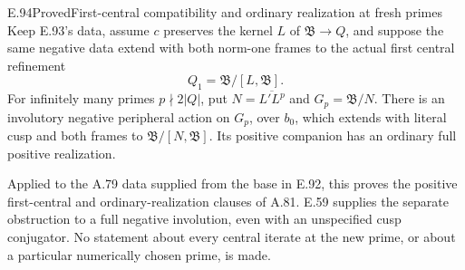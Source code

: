 \begin{result}{E.94}{Proved}{First-central compatibility and ordinary realization at fresh primes}
Keep E.93's data, assume \(c\) preserves the kernel \(L\) of
\(\mathfrak B\to Q\), and suppose the same negative data extend
with both norm-one frames to the actual first central refinement
\[
 Q_1=\mathfrak B/[L,\mathfrak B].
 \]
For infinitely many primes \(p\nmid2|Q|\), put
\(N=\overline{L'L^p}\) and \(G_p=\mathfrak B/N\).
There is an involutory negative peripheral action on \(G_p\),
over \(b_0\), which extends with literal cusp and both frames
to \(\mathfrak B/[N,\mathfrak B]\).
Its positive companion has an ordinary full positive realization.

Applied to the A.79 data supplied from the base in E.92, this
proves the positive first-central and ordinary-realization clauses
of A.81.  E.59 supplies the separate obstruction to a full negative
involution, even with an unspecified cusp conjugator.
No statement about every central iterate at the new prime,
or about a particular numerically chosen prime, is made.
\end{result}
